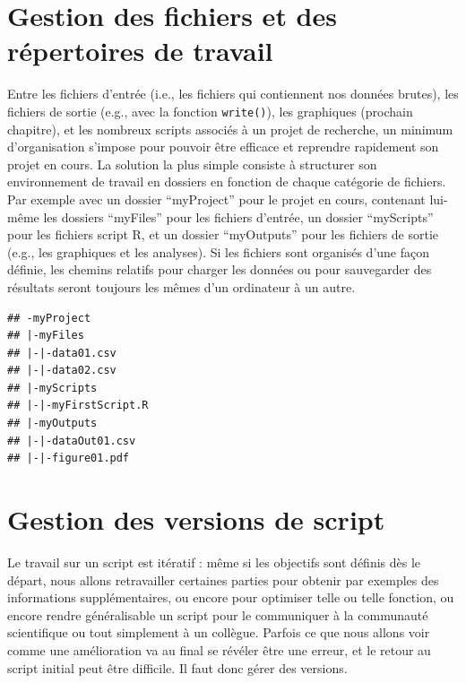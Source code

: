 \documentclass[
]{book}
\begin{document}
\hypertarget{gestion-des-fichiers-et-des-ruxe9pertoires-de-travail}{%
\section{Gestion des fichiers et des répertoires de travail}\label{gestion-des-fichiers-et-des-ruxe9pertoires-de-travail}}

Entre les fichiers d'entrée (i.e., les fichiers qui contiennent nos données brutes), les fichiers de sortie (e.g., avec la fonction \texttt{write()}), les graphiques (prochain chapitre), et les nombreux scripts associés à un projet de recherche, un minimum d'organisation s'impose pour pouvoir être efficace et reprendre rapidement son projet en cours. La solution la plus simple consiste à structurer son environnement de travail en dossiers en fonction de chaque catégorie de fichiers. Par exemple avec un dossier ``myProject'' pour le projet en cours, contenant lui-même les dossiers ``myFiles'' pour les fichiers d'entrée, un dossier ``myScripts'' pour les fichiers script R, et un dossier ``myOutputs'' pour les fichiers de sortie (e.g., les graphiques et les analyses). Si les fichiers sont organisés d'une façon définie, les chemins relatifs pour charger les données ou pour sauvegarder des résultats seront toujours les mêmes d'un ordinateur à un autre.

\begin{verbatim}
## -myProject
## |-myFiles
## |-|-data01.csv
## |-|-data02.csv
## |-myScripts
## |-|-myFirstScript.R
## |-myOutputs
## |-|-dataOut01.csv
## |-|-figure01.pdf
\end{verbatim}

\hypertarget{gestion-des-versions-de-script}{%
\section{Gestion des versions de script}\label{gestion-des-versions-de-script}}

Le travail sur un script est itératif : même si les objectifs sont définis dès le départ, nous allons retravailler certaines parties pour obtenir par exemples des informations supplémentaires, ou encore pour optimiser telle ou telle fonction, ou encore rendre généralisable un script pour le communiquer à la communauté scientifique ou tout simplement à un collègue. Parfois ce que nous allons voir comme une amélioration va au final se révéler être une erreur, et le retour au script initial peut être difficile. Il faut donc gérer des versions.
\end{document}
